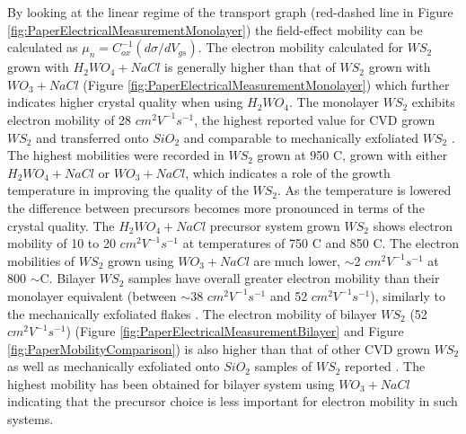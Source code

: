 By looking at the linear regime of the transport graph (red-dashed line in Figure \ref{fig:PaperElectricalMeasurementMonolayer}) the field-effect mobility can be calculated as ${\mu}_n=C_{ox}^{-1}(d{\sigma}/dV_{gs})$. The electron mobility calculated for $WS_2$ grown with $H_2WO_4 + NaCl$ is generally higher than that of $WS_2$ grown with $WO_3 + NaCl$ (Figure \ref{fig:PaperElectricalMeasurementMonolayer}) which further indicates higher crystal quality when using $H_2WO_4$. The monolayer $WS_2$ exhibits electron mobility of 28 $cm^2 V^{-1} s^{-1}$, the highest reported value for CVD grown $WS_2$ and transferred onto $SiO_2$ \cite{Li2015}\cite{Kang2015}\cite{Gao2015}\cite{doi:10.1021/nn403454e}\cite{doi:10.1021/acsnano.5b01480}\cite{Lee2013}\cite{Yun2015}\cite{Alharbi2016}\cite{Lan2015}\cite{Hussain2013}\cite{Cui2015} and comparable to mechanically exfoliated $WS_2$ \cite{Withers2014}\cite{Iqbal2016}\cite{Georgiou2014}\cite{Iqbal2015a}. The highest mobilities were recorded in $WS_2$ grown at 950 {\degree}C, grown with either $H_2WO_4 + NaCl$ or $WO_3 + NaCl$, which indicates a role of the growth temperature in improving the quality of the $WS_2$. As the temperature is lowered the difference between precursors becomes more pronounced in terms of the crystal quality. The $H_2WO_4 + NaCl$ precursor system grown $WS_2$ shows electron mobility of 10 to 20 $cm^2 V^{-1} s^{-1}$ at temperatures of 750 {\degree}C and 850 {\degree}C. The electron mobilities of $WS_2$ grown using $WO_3 + NaCl$ are much lower, {$\sim$}2 $cm^2 V^{-1} s^{-1}$ at 800 $\sim$C. Bilayer $WS_2$ samples have overall greater electron mobility than their monolayer equivalent (between {$\sim$}38 $cm^2 V^{-1} s^{-1}$ and 52 $cm^2 V^{-1} s^{-1}$), similarly to the mechanically exfoliated flakes \cite{Ovchinnikov2014}\cite{Iqbal2015a}. The electron mobility of bilayer $WS_2$ (52 $cm^2 V^{-1} s^{-1}$) (Figure \ref{fig:PaperElectricalMeasurementBilayer} and Figure \ref{fig:PaperMobilityComparison}) is also higher than that of other CVD grown $WS_2$ as well as mechanically exfoliated onto $SiO_2$ samples of $WS_2$ reported  \cite{Iqbal2015}\cite{Ovchinnikov2014}\cite{Iqbal2015a}. The highest mobility has been obtained for bilayer system using $WO_3 + NaCl$ indicating that the precursor choice is less important for electron mobility in such systems. 

